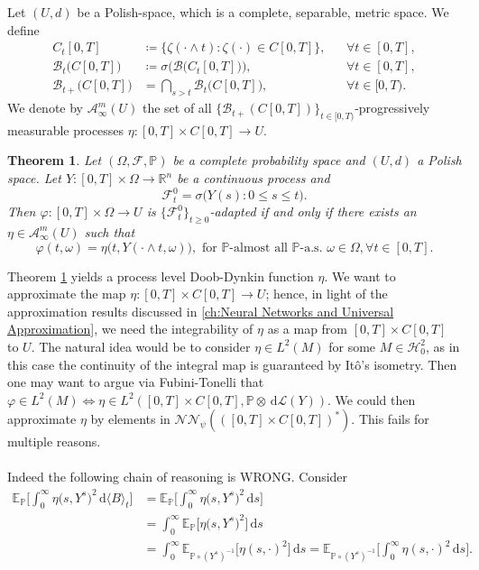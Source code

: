\documentclass[11pt,a4paper,twoside,openany]{report}
\numberwithin{equation}{section}
\newcommand{\diff}{\mathrm{d}}
\theoremstyle{plain} %
\newtheorem{theorem}{Theorem}[section]
\theoremstyle{definition} %
\theoremstyle{remark} %
\begin{document}
Let \((U,d)\) be a Polish-space, which is a complete, separable, metric space. 
We define
\begin{align*}
C_t[0,T]
&\coloneqq \bigg\{\zeta(\cdot\wedge t):\zeta(\cdot)\in C[0,T]\bigg\},
&& \forall t\in[0,T],\\
\mathcal{B}_t\bigg(C[0,T]\bigg)
&\coloneqq \sigma\bigg(\mathcal{B}\bigg(C_t[0,T]\bigg)\bigg),
&& \forall t\in[0,T],\\
\mathcal{B}_{t+}\bigg(C[0,T]\bigg)
&= \bigcap_{s>t}\mathcal{B}_t\bigg(C[0,T]\bigg),
&& \forall t\in[0,T).
\end{align*}
We denote by \(\mathcal{A}_{\infty}^m(U)\) the set of all \(\{\mathcal{B}_{t+}(C[0,T])\}_{t\in[0,T)}\)-progressively measurable processes \(\eta:[0,T]\times C[0,T]\to U\).
\begin{theorem}\label{thm:process level doob dynkin}
Let $(\Omega,\mathcal{F},\mathbb{P})$ be a complete probability space and $(U,d)$ a Polish space.
Let $Y:[0,T]\times\Omega\to\mathbb{R}^n$ be a continuous process and
\[
\mathcal{F}_t^{0}=\sigma\bigg(Y(s):0\le s\le t\bigg).
\]
Then $\varphi:[0,T]\times\Omega\to U$ is $\{\mathcal{F}_t^0\}_{t\ge 0}$-adapted if and only if there exists
an $\eta\in\mathcal{A}_{\infty}^m(U)$ such that
\begin{equation*}
\varphi(t,\omega)=\eta\big(t,Y(\cdot\wedge t,\omega)\big),
 \text{ for }\mathbb{P}\text{-almost all }\mathbb{P}\text{-a.s. }\omega\in\Omega,\forall t\in[0,T].
\end{equation*}
\end{theorem}
Theorem \ref{thm:process level doob dynkin} yields a process level Doob-Dynkin function \(\eta\).
 We want to approximate the map \(\eta:[0,T]\times C[0,T]\to U\); hence, in light of the approximation results discussed in \cref{ch:Neural Networks and Universal Approximation}, we need the integrability of \(\eta\) as a map from \([0,T]\times C[0,T]\) to \(U\). The natural idea would be to consider \(\eta\in L^2(M)\) for some \(M\in\mathcal{H}_{0}^2\), as in this case the continuity of the integral map is guaranteed by Itô's isometry. Then one may want to argue via Fubini-Tonelli that \(\varphi\in L^2(M)\iff \eta\in L^2([0,T]\times C[0,T],\mathbb{P}\otimes\,\diff\mathcal{L}(Y))\). We could then approximate \(\eta\) by elements in \(\mathcal{NN}_\psi(([0,T]\times C[0,T])^*)\). This fails for multiple reasons. \\\\
Indeed the following chain of reasoning is WRONG. Consider
\begin{align*}
\mathbb{E}_{\mathbb{P}}\bigg[\int_0^{\infty}\eta\big(s,Y^s\big)^2\,\diff \langle B\rangle_t\bigg]&= \mathbb{E}_{\mathbb{P}}\bigg[\int_0^{\infty}\eta\big(s,Y^s\big)^2\,\diff s\bigg]
\\&=\int_0^{\infty}\mathbb{E}_{\mathbb{P}}\Big[\eta\big(s,Y^s\big)^2\Big]\,\diff s\\&=\int_0^{\infty}\mathbb{E}_{\mathbb{P}\circ (Y^{s})^{-1}}\Big[\eta(s,\cdot)^2\Big]\,\diff s
   =\mathbb{E}_{\mathbb{P}\circ (Y^{s})^{-1}}\bigg[\int_0^{\infty}\eta(s,\cdot)^2\,\diff s\bigg].
\end{align*}
\end{document}
